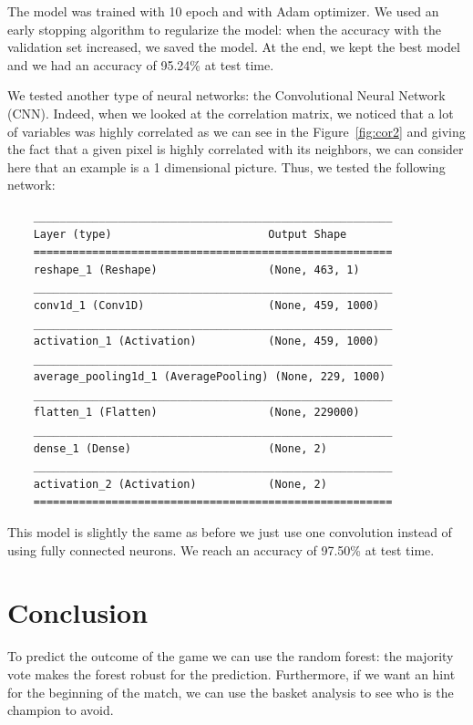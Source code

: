 \documentclass{article}
\begin{document}
The model was trained with 10 epoch and with Adam optimizer.
We used an early stopping algorithm to regularize the model: when the accuracy with the validation set increased, we saved the model. At the end, we kept the best model and we had an accuracy of 95.24\% at test time.

We tested another type of neural networks: the Convolutional Neural Network (CNN). Indeed, when we looked at the correlation matrix, we noticed that a lot of variables was highly correlated as we can see in the Figure~\ref{fig:cor2} and giving the fact that a given pixel is highly correlated with its neighbors, we can consider here that an example is a 1 dimensional picture. Thus, we tested the following network:

\begin{verbatim}
    _______________________________________________________
    Layer (type)                        Output Shape
    =======================================================
    reshape_1 (Reshape)                 (None, 463, 1)
    _______________________________________________________
    conv1d_1 (Conv1D)                   (None, 459, 1000) 
    _______________________________________________________
    activation_1 (Activation)           (None, 459, 1000) 
    _______________________________________________________
    average_pooling1d_1 (AveragePooling) (None, 229, 1000)
    _______________________________________________________
    flatten_1 (Flatten)                 (None, 229000)
    _______________________________________________________
    dense_1 (Dense)                     (None, 2)
    _______________________________________________________
    activation_2 (Activation)           (None, 2) 
    =======================================================
\end{verbatim}
This model is slightly the same as before we just use one convolution instead of using fully connected neurons. We reach an accuracy of 97.50\% at test time.

\section{Conclusion}
To predict the outcome of the game we can use the random forest: the majority vote makes the forest robust for the prediction. Furthermore, if we want an hint for the beginning of the match, we can use the basket analysis to see who is the champion to avoid.
\end{document}
